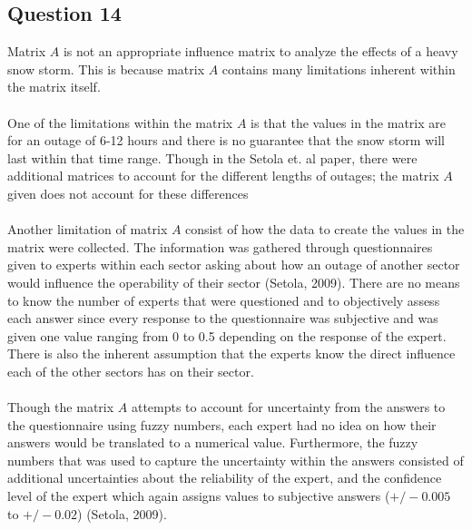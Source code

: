 \documentclass[11pt,a4paper]{article}
\begin{document}
\subsection*{Question 14}
Matrix $A$ is not an appropriate influence matrix to analyze the effects of a heavy snow storm. This is because matrix $A$ contains many limitations inherent within the matrix itself.\\
\\
One of the limitations within the matrix $A$ is that the values in the matrix are for an outage of 6-12 hours and there is no guarantee that the snow storm will last within that time range. Though in the Setola et. al paper, there were additional matrices to account for the different lengths of outages; the matrix $A$ given does not account for these differences\\
\\
Another limitation of matrix $A$ consist of how the data to create the values in the matrix were collected. The information was gathered through questionnaires given to experts within each sector asking about how an outage of another sector would influence the operability of their sector (Setola, 2009). There are no means to know the number of experts that were questioned and to objectively assess each answer since every response to the questionnaire was subjective and was given one value ranging from 0 to 0.5 depending on the response of the expert. There is also the inherent assumption that the experts know the direct influence each of the other sectors has on their sector.\\
\\
Though the matrix $A$ attempts to account for uncertainty from the answers to the questionnaire using fuzzy numbers, each expert had no idea on how their answers would be translated to a numerical value. Furthermore, the fuzzy numbers that was used to capture the uncertainty within the answers consisted of additional uncertainties about the reliability of the expert, and the confidence level of the expert which again assigns values to subjective answers ($+/-0.005$ to $+/-0.02$) (Setola, 2009).
\end{document}
